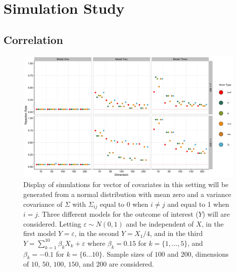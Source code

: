 \documentclass{article}
\begin{document}
\section{Simulation Study}
\label{sec:sim_stdy}

\subsection{Correlation}



\begin{figure}[]
	\centering
\includegraphics[width = \linewidth]{uncor.jpg}
	\caption{Display of simulations for vector of covariates in this setting will be generated from a normal distribution with mean zero and a variance covariance of $\Sigma$ with $\Sigma_{ij}$ equal to $0$ when $i \neq j$ and equal to 1 when $i = j$. Three different models for the outcome of interest ($Y$) will are considered. Letting $\varepsilon \sim N(0, 1)$ and be independent of $X$, in the first model $Y = \varepsilon$, in the second $Y = X_1 / 4$, and in the third $Y = \sum_{k = 1}^{10} \beta_k X_k + \varepsilon$ where $\beta_k = 0.15$ for $k = \{1, \dots, 5\}$, and $\beta_k = -0.1$ for $k = \{6 \dots 10\}$. Sample sizes of $100$ and $200$, dimensions of $10$, $50$, $100$, $150$, and $200$ are considered.}
	\label{fig:uncor}
\end{figure}
\end{document}
